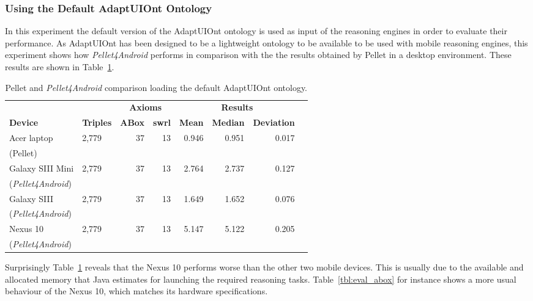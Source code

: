 \subsubsection{Using the Default AdaptUIOnt Ontology}
\label{sec:eval_default_ont}

In this experiment the default version of the AdaptUIOnt ontology is used as 
input of the reasoning engines in order to evaluate their performance. As 
AdaptUIOnt has been designed to be a lightweight ontology to be available to be 
used with mobile reasoning engines, this experiment shows how \textit{Pellet4Android} 
performs in comparison with the the results obtained by Pellet in a desktop 
environment. These results are shown in Table~\ref{tbl:eval_default_ont}.

\begin{table}
 \caption{Pellet and \textit{Pellet4Android} comparison loading the default 
AdaptUIOnt ontology.}
 \label{tbl:eval_default_ont}
 \footnotesize
 \centering
  \begin{tabular}{l l r r r r r r}
  \hline 
  &  & \multicolumn{2}{c}{\textbf{Axioms}} & 
  \multicolumn{3}{c}{\textbf{Results}}	\\
  \textbf{Device} & \textbf{Triples}& \textbf{ABox} & \textbf{\ac{swrl}}
  & \textbf{Mean} & \textbf{Median} & \textbf{Deviation}	\\
  \hline 
  Acer laptop	& 2,779	& 37  & 13 & 0.946 & 0.951 & 0.017	\\
  (Pellet)							\\
  Galaxy SIII Mini& 2,779& 37 & 13 & 2.764 & 2.737 & 0.127	\\
  (\textit{Pellet4Android})					\\
  Galaxy SIII	& 2,779	& 37  & 13 & 1.649 & 1.652 & 0.076	\\
  (\textit{Pellet4Android})					\\
  Nexus 10	& 2,779	& 37  & 13 & 5.147 & 5.122 & 0.205	\\
  (\textit{Pellet4Android})					\\
  \hline
\end{tabular}
\end{table}

Surprisingly Table~\ref{tbl:eval_default_ont} reveals that the Nexus 10 performs
worse than the other two mobile devices. This is usually due to the available
and allocated memory that Java estimates for launching the required reasoning
tasks. Table~\ref{tbl:eval_abox} for instance shows a more usual behaviour of
the Nexus 10, which matches its hardware specifications.


